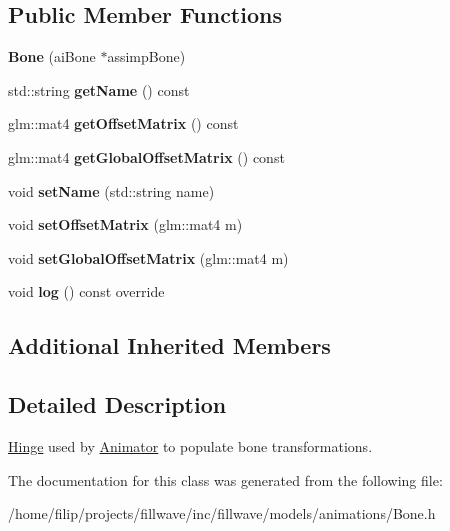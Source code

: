 \subsection*{Public Member Functions}
\begin{DoxyCompactItemize}
\item 
\mbox{\label{classflw_1_1flf_1_1Bone_a392042b750cc4bf561825ee302202fb5}} 
{\bfseries Bone} (ai\+Bone $\ast$assimp\+Bone)
\item 
\mbox{\label{classflw_1_1flf_1_1Bone_a6ec80d20a627087b9f009b9ab7f72896}} 
std\+::string {\bfseries get\+Name} () const
\item 
\mbox{\label{classflw_1_1flf_1_1Bone_a00cd6547270d60199226ffbb69d67f52}} 
glm\+::mat4 {\bfseries get\+Offset\+Matrix} () const
\item 
\mbox{\label{classflw_1_1flf_1_1Bone_a6d33c365f8ba1345e3aa21da319c4f6e}} 
glm\+::mat4 {\bfseries get\+Global\+Offset\+Matrix} () const
\item 
\mbox{\label{classflw_1_1flf_1_1Bone_a6cf797dea162d2c87716ba961501b3f6}} 
void {\bfseries set\+Name} (std\+::string name)
\item 
\mbox{\label{classflw_1_1flf_1_1Bone_a457c06cf7d1b77cf6a88e95800c13cf0}} 
void {\bfseries set\+Offset\+Matrix} (glm\+::mat4 m)
\item 
\mbox{\label{classflw_1_1flf_1_1Bone_a32ce1f1f71f73a92e2916ff83b721e54}} 
void {\bfseries set\+Global\+Offset\+Matrix} (glm\+::mat4 m)
\item 
\mbox{\label{classflw_1_1flf_1_1Bone_ae1a421ceb6ee7d32bb01aa7f388c15a4}} 
void {\bfseries log} () const override
\end{DoxyCompactItemize}
\subsection*{Additional Inherited Members}


\subsection{Detailed Description}
\hyperlink{classflw_1_1flf_1_1Hinge}{Hinge} used by \hyperlink{classflw_1_1flf_1_1Animator}{Animator} to populate bone transformations. 

The documentation for this class was generated from the following file\+:\begin{DoxyCompactItemize}
\item 
/home/filip/projects/fillwave/inc/fillwave/models/animations/Bone.\+h\end{DoxyCompactItemize}
